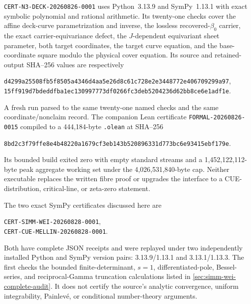 \texttt{CERT-N3-DECK-20260826-0001} uses Python~3.13.9 and SymPy~1.13.1 with
exact symbolic polynomial and rational arithmetic.  Its twenty-one checks cover the affine
deck-curve parametrization and inverse, the lossless recovered-$\beta_0$ carrier, the exact
carrier-equivariance defect, the $J$-dependent equivariant sheet parameter, both target
coordinates, the target curve equation, and the base-coordinate square modulo the physical
cover equation.  Its source and retained-output SHA--256 values are respectively
\begin{center}
\small
\texttt{d4299a25508fb5f8505a4346d4aa5e26d8c61c728e2e3448772e406709299a97},\\
\texttt{15ff919d7bdeddfba1ec130997773df0266fc3deb5204236d62bb8ce6e1adf1e}.
\end{center}
A fresh run parsed to the same twenty-one named checks and the same coordinate/nonclaim record.
The companion Lean certificate \texttt{FORMAL-20260826-0015} compiled to a 444,184-byte
\texttt{.olean} at SHA--256
\begin{center}
\small\texttt{8bd2c3f79ffe8e4b48220a1679cf3eb143b520896331d773bc6e93415ebf179e}.
\end{center}
Its bounded build exited zero with empty standard streams and a 1,452,122,112-byte peak
aggregate working set under the 4,026,531,840-byte cap.  Neither executable replaces the
written fibre proof or upgrades the interface to a CUE-distribution, critical-line, or
zeta-zero statement.

The two exact SymPy certificates discussed here are
\begin{center}\small
\texttt{CERT-SIMM-WEI-20260828-0001},\\
\texttt{CERT-CUE-MELLIN-20260828-0001}.
\end{center}
Both have complete JSON receipts and were replayed under two independently installed
Python and SymPy version pairs:
3.13.9/1.13.1 and 3.13.1/1.13.3.  The first checks the bounded finite-determinant,
$s=1$, differentiated-pole, Bessel-series, and reciprocal-Gamma truncation calculations
listed in \cref{sec:simm-wei-complete-audit}.  It does not certify the source's
analytic convergence, uniform integrability, Painlev\'e, or conditional number-theory
arguments.

